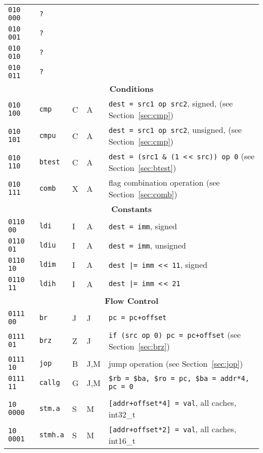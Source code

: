 \documentclass[10pt,DIV12]{scrartcl}
\newcommand{\shl}{\textless$\,\!$\textless}
\begin{document}
\begin{longtable}{llllp{}}
\cmidrule{1-5}
\texttt{010 000} & \texttt{?} & & & \\
\texttt{010 001} & \texttt{?} & & & \\
\texttt{010 010} & \texttt{?} & & & \\
\texttt{010 011} & \texttt{?} & & & \\
\midrule
\multicolumn{5}{c}{\textsf{\textbf{Conditions}}} \\
\cmidrule{1-5}
\texttt{010 100} & \texttt{cmp} & C & A & \texttt{dest = src1 op src2}, signed, (see Section~\ref{sec:cmp}) \\
\texttt{010 101} & \texttt{cmpu} & C & A & \texttt{dest = src1 op src2}, unsigned, (see Section~\ref{sec:cmp}) \\
\texttt{010 110} & \texttt{btest} & C & A & \texttt{dest = (src1 \& (1 \shl{} src)) op 0} (see Section~\ref{sec:btest}) \\
\texttt{010 111} & \texttt{comb} & X & A & flag combination operation (see Section~\ref{sec:comb}) \\
\midrule
\multicolumn{5}{c}{\textsf{\textbf{Constants}}} \\
\cmidrule{1-5}
\texttt{0110 00} & \texttt{ldi} & I & A & \texttt{dest = imm}, signed \\
\texttt{0110 01} & \texttt{ldiu} & I & A & \texttt{dest = imm}, unsigned \\
\texttt{0110 10} & \texttt{ldim} & I & A & \texttt{dest |= imm \shl{} 11}, signed \\
\texttt{0110 11} & \texttt{ldih} & I & A & \texttt{dest |= imm \shl{} 21} \\
\midrule
\multicolumn{5}{c}{\textsf{\textbf{Flow Control}}} \\
\cmidrule{1-5}
\texttt{0111 00} & \texttt{br} & J & J & \texttt{pc = pc+offset} \\
\texttt{0111 01} & \texttt{brz} & Z & J & \texttt{if (src op 0) pc = pc+offset} (see Section~\ref{sec:brz}) \\
\texttt{0111 10} & \texttt{jop} & B & J,M & jump operation (see Section~\ref{sec:jop}) \\
\texttt{0111 11} & \texttt{callg} & G & J,M & \texttt{\$rb = \$ba, \$ro = pc, \$ba = addr*4, pc = 0} \\
\midrule
\pagebreak
\midrule
\multicolumn{5}{c}{\textsf{\textbf{Memory Accesses}}} \\
\cmidrule{1-5}
\texttt{10 0000} & \texttt{stm.a} & S & M & \texttt{[addr+offset*4] = val}, all caches, int32\_t \\
\texttt{10 0001} & \texttt{stmh.a} & S & M & \texttt{[addr+offset*2] = val}, all caches, int16\_t \\

\end{longtable}
\end{document}
